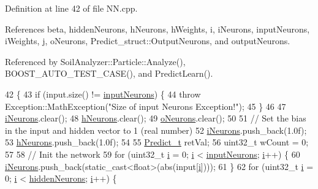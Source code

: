 Definition at line 42 of file N\+N.\+cpp.



References beta, hidden\+Neurons, h\+Neurons, h\+Weights, i, i\+Neurons, input\+Neurons, i\+Weights, j, o\+Neurons, Predict\+\_\+struct\+::\+Output\+Neurons, and output\+Neurons.



Referenced by Soil\+Analyzer\+::\+Particle\+::\+Analyze(), B\+O\+O\+S\+T\+\_\+\+A\+U\+T\+O\+\_\+\+T\+E\+S\+T\+\_\+\+C\+A\+S\+E(), and Predict\+Learn().


\begin{DoxyCode}
42                                          \{
43   \textcolor{keywordflow}{if} (input.size() != \hyperlink{class_soil_math_1_1_n_n_a51723ae01e9b0a95c9aa6ac4f4c569fc}{inputNeurons}) \{
44     \textcolor{keywordflow}{throw} Exception::MathException(\textcolor{stringliteral}{"Size of input Neurons Exception!"});
45   \}
46 
47   \hyperlink{class_soil_math_1_1_n_n_aa5a6a6014722338fb8af2f79d6187998}{iNeurons}.clear();
48   \hyperlink{class_soil_math_1_1_n_n_a459bde01ce33e0b27803cbe4a3b114b4}{hNeurons}.clear();
49   \hyperlink{class_soil_math_1_1_n_n_a50a52b41982f6845dc5294f17607774b}{oNeurons}.clear();
50 
51   \textcolor{comment}{// Set the bias in the input and hidden vector to 1 (real number)}
52   \hyperlink{class_soil_math_1_1_n_n_aa5a6a6014722338fb8af2f79d6187998}{iNeurons}.push\_back(1.0f);
53   \hyperlink{class_soil_math_1_1_n_n_a459bde01ce33e0b27803cbe4a3b114b4}{hNeurons}.push\_back(1.0f);
54 
55   \hyperlink{struct_predict__struct}{Predict\_t} retVal;
56   uint32\_t wCount = 0;
57 
58   \textcolor{comment}{// Init the network}
59   \textcolor{keywordflow}{for} (uint32\_t \hyperlink{_comparision_pictures_2_createtest_image_8m_a6f6ccfcf58b31cb6412107d9d5281426}{i} = 0; \hyperlink{_comparision_pictures_2_createtest_image_8m_a6f6ccfcf58b31cb6412107d9d5281426}{i} < \hyperlink{class_soil_math_1_1_n_n_a51723ae01e9b0a95c9aa6ac4f4c569fc}{inputNeurons}; \hyperlink{_comparision_pictures_2_createtest_image_8m_a6f6ccfcf58b31cb6412107d9d5281426}{i}++) \{
60     \hyperlink{class_soil_math_1_1_n_n_aa5a6a6014722338fb8af2f79d6187998}{iNeurons}.push\_back(static\_cast<float>(abs(input[\hyperlink{_comparision_pictures_2_createtest_image_8m_a6f6ccfcf58b31cb6412107d9d5281426}{i}])));
61   \}
62   \textcolor{keywordflow}{for} (uint32\_t \hyperlink{_comparision_pictures_2_createtest_image_8m_a6f6ccfcf58b31cb6412107d9d5281426}{i} = 0; \hyperlink{_comparision_pictures_2_createtest_image_8m_a6f6ccfcf58b31cb6412107d9d5281426}{i} < \hyperlink{class_soil_math_1_1_n_n_aedf4b2ddaae281d83e666c308e5d67c4}{hiddenNeurons}; \hyperlink{_comparision_pictures_2_createtest_image_8m_a6f6ccfcf58b31cb6412107d9d5281426}{i}++) \{

\end{DoxyCode}
